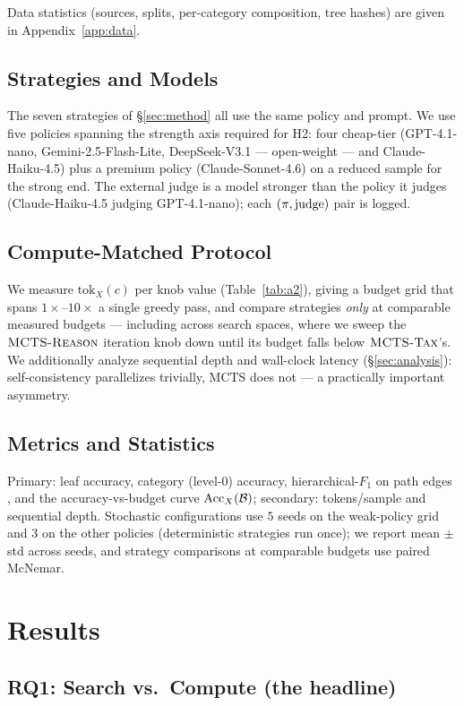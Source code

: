 Data statistics (sources, splits, per-category composition, tree hashes) are
given in Appendix~\ref{app:data}.

\subsection{Strategies and Models}
The seven strategies of \S\ref{sec:method} all use the same policy and prompt.
We use five policies spanning the strength axis required for H2: four
cheap-tier (GPT-4.1-nano, Gemini-2.5-Flash-Lite, DeepSeek-V3.1 --- open-weight
--- and Claude-Haiku-4.5) plus a premium policy (Claude-Sonnet-4.6) on a
reduced sample for the strong end. The external judge is a model stronger than
the policy it judges (Claude-Haiku-4.5 judging GPT-4.1-nano); each
$(\pi,\text{judge})$ pair is logged.

\subsection{Compute-Matched Protocol}
We measure $\mathrm{tok}_X(c)$ per knob value (Table~\ref{tab:a2}), giving a
budget grid that spans $1\times$--$10\times$ a single greedy pass, and compare
strategies \emph{only} at comparable measured budgets --- including across
search spaces, where we sweep the $\textsc{MCTS-Reason}$ iteration knob down until its
budget falls below $\textsc{MCTS-Tax}$'s. We additionally analyze sequential depth and
wall-clock latency (\S\ref{sec:analysis}): self-consistency parallelizes
trivially, MCTS does not --- a practically important asymmetry.

\subsection{Metrics and Statistics}
Primary: leaf accuracy, category (level-0) accuracy, hierarchical-$F_1$ on path
edges \citep{kosmopoulos2015evaluation}, and the accuracy-vs-budget curve
$\mathrm{Acc}_X(\mathcal{B})$; secondary: tokens/sample and sequential depth. Stochastic
configurations use $5$ seeds on the weak-policy grid and $3$ on the other
policies (deterministic strategies run once); we report mean $\pm$ std across
seeds, and strategy comparisons at comparable budgets use paired McNemar.

\section{Results}
\label{sec:results}

\subsection{RQ1: Search vs.\ Compute (the headline)}

